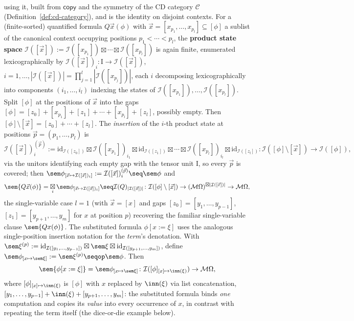 \begin{definition}
using it, built from $\mathsf{copy}$ and the symmetry of the CD
category $\mathcal C$ (Definition~\ref{def:cd-category}), and is the
identity on disjoint contexts. For a (finite-sorted) quantified formula
$Q\vec x(\phi)$ with $\vec x = [x_{p_1},\ldots,x_{p_l}] \subseteq [\phi]$
a sublist of the canonical context occupying positions
$p_1 < \cdots < p_l$, the \textbf{product state space}
$\mathcal I([\vec x]) := \mathcal I([x_{p_1}]) \boxtimes \cdots \boxtimes
\mathcal I([x_{p_l}])$ is again finite, enumerated lexicographically by
$\mathcal I([\vec x])_i \colon \mathrm I \to \mathcal I([\vec x])$,
$i = 1,\ldots,|\mathcal I([\vec x])| = \prod_{j=1}^l|\mathcal
I([x_{p_j}])|$, each $i$ decomposing lexicographically into components
$(i_1,\ldots,i_l)$ indexing the states of
$\mathcal I([x_{p_1}]),\ldots,\mathcal I([x_{p_l}])$. Split $[\phi]$ at
the positions of $\vec x$ into the gaps
$[\phi] = [z_0] + [x_{p_1}] + [z_1] + \cdots + [x_{p_l}] + [z_l]$,
possibly empty. Then $[\phi]\setminus[\vec x] = [z_0]+\cdots+[z_l]$.
The \emph{insertion} of the $i$-th product state at positions
$\vec p = (p_1,\ldots,p_l)$ is
\[
  \mathcal I([\vec x])_i^{(\vec p)} := \mathrm{id}_{\mathcal I([z_0])}
  \boxtimes \mathcal I([x_{p_1}])_{i_1} \boxtimes \mathrm{id}_{\mathcal
  I([z_1])} \boxtimes \cdots \boxtimes \mathcal I([x_{p_l}])_{i_l} \boxtimes
  \mathrm{id}_{\mathcal I([z_l])} \colon \mathcal I([\phi]\setminus[\vec
  x]) \to \mathcal I([\phi]),
\]
via the unitors identifying each empty gap with the tensor unit
$\mathrm I$, so every $\vec p$ is covered; then
$\sem\phi_{[\vec x \mapsto \mathcal I([\vec x])_i]} := \mathcal
I([\vec x])_i^{(\vec p)} \seq \sem\phi$ and
\[
  \sem{Q\vec x(\phi)} = \mathop{\boxtimes}\limits_i \sem\phi_{[\vec x \mapsto \mathcal
  I([\vec x])_i]} \seq \mathcal I(Q)_{|\mathcal I([\vec x])|} \colon
  \mathcal I([\phi]\setminus[\vec x]) \to (\mathcal M\Omega)^{\boxtimes
  |\mathcal I([\vec x])|} \to \mathcal M\Omega,
\]
the single-variable case $l=1$ (with $\vec x = [x]$ and gaps
$[z_0]=[y_1,\ldots,y_{p-1}]$, $[z_1]=[y_{p+1},\ldots,y_m]$ for $x$ at
position $p$) recovering the familiar single-variable clause $\sem{Qx(\phi)}$.
The substituted formula $\phi[x:=\xi]$ uses the analogous
single-position insertion notation for the \emph{term}'s denotation.
With $\sem\xi^{(p)} := \mathrm{id}_{\mathcal I([y_1,\ldots,y_{p-1}])} \boxtimes
\sem\xi \boxtimes \mathrm{id}_{\mathcal I([y_{p+1},\ldots,y_m])}$,
define $\sem\phi_{[x \mapsto \sem\xi]} := \sem\xi^{(p)} \seqop \sem\phi$.
Then
\[
  \sem{\phi[x:=\xi]} = \sem\phi_{[x \mapsto \sem\xi]} \colon \mathcal
  I([\phi]_{[x]\mapsto\inn(\xi)}) \to \mathcal M\Omega,
\]
where $[\phi]_{[x]\mapsto\inn(\xi)}$ is $[\phi]$ with $x$ replaced by
$\inn(\xi)$ via list concatenation,
$[y_1,\ldots,y_{p-1}] + \inn(\xi) + [y_{p+1},\ldots,y_m]$: the
substituted formula binds \emph{one} computation and copies its
\emph{value} into every occurrence of $x$, in contrast with repeating
the term itself (the dice-or-die example below).
\end{definition}


